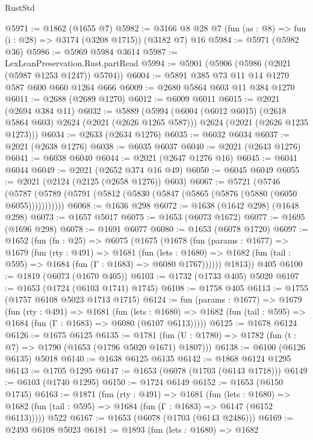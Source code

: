 \begin{lexlean}{RustStd}
\begin{coremodule}
@5971 := @1862 (@1655 @7)
@5982 := @3166 @8 @28 @7 (fun (as : @8) => fun (i : @28) => @3174 (@3208 @1715)) (@3182 @7) @16
@5984 := @5971 (@5982 @36)
@5986 := @5969 @5984 @3614
@5987 := LexLeanPreservation.Rust.partRead
@5994 := @5901 (@5906 (@5986 (@2021 (@5987 @1253 @1247)) @5704))
@6004 := @5891 @385 @73 @11 @14 @1270 @587 @600 @660 @1264 @666
@6009 := @2680 @5864 @603 @11 @384 @1270
@6011 := @2688 (@2689 @1270)
@6012 := @6009 @6011
@6015 := @2021 (@2694 @384 @11)
@6032 := @5889
    (@5994
      (@6004 (@6012 @6015) (@2618 @5864 @603) @2624 (@2021 (@2626 @1265 @587)))
      @2624
      (@2021 (@2626 @1235 @1273)))
@6034 := @2633 (@2634 @1276)
@6035 := @6032 @6034
@6037 := @2021 (@2638 @1276)
@6038 := @6035 @6037
@6040 := @2021 (@2643 @1276)
@6041 := @6038 @6040
@6044 := @2021 (@2647 @1276 @16)
@6045 := @6041 @6044
@6049 := @2021 (@2652 @374 @16 @49)
@6050 := @6045 @6049
@6055 := @2021 (@2124 (@2125 (@2658 @1276)) @603)
@6067 := @5721
    (@5746 (@5787 (@5789 (@5791 (@5812 (@5830 (@5847 (@5865 (@5876 (@5880 (@6050 @6055)))))))))))
@6068 := @1636 @298
@6072 := @1638 (@1642 @298) (@1648 @298)
@6073 := @1657 @5017
@6075 := @1653 (@6073 @1672)
@6077 := @1695 (@1696 @298)
@6078 := @1691 @6077
@6080 := @1653 (@6078 @1720)
@6097 := @1652
    (fun (fn : @25) =>
    @6075
      (@1675
        (@1678
          (fun (params : @1677) =>
          @1679
            (fun (rty : @491) =>
            @1681
              (fun (lets : @1680) =>
              @1682 (fun (tail : @595) => @1684 (fun (Γ : @1683) => @6080 @1767))))))
        @1813))
    @405
@6100 := @1819 (@6073 (@1670 @405))
@6103 := @1732 (@1733 @405) @5020
@6107 := @1653 (@1724 (@6103 @1741) @1745)
@6108 := @1758 @405
@6113 := @1755 (@1757 @6108 @5023 @1713 @1715)
@6124 := fun (params : @1677) =>
  @1679
    (fun (rty : @491) =>
    @1681
      (fun (lets : @1680) =>
      @1682 (fun (tail : @595) => @1684 (fun (Γ : @1683) => @6080 (@6107 @6113)))))
@6125 := @1678 @6124
@6126 := @1675 @6125
@6135 := @1781 (fun (U : @1780) => @1782 (fun (t : @7) => @1790 (@1653 (@1796 @5020 @1671) @1807)))
@6138 := @6100 (@6126 @6135) @5018
@6140 := @1638 @6125 @6135
@6142 := @1868 @6124 @1295
@6143 := @1705 @1295
@6147 := @1653 (@6078 (@1703 (@6143 @1718)))
@6149 := @6103 (@1740 @1295)
@6150 := @1724 @6149
@6152 := @1653 (@6150 @1745)
@6163 := @1871
    (fun (rty : @491) =>
    @1681
      (fun (lets : @1680) =>
      @1682 (fun (tail : @595) => @1684 (fun (Γ : @1683) => @6147 (@6152 @6113)))))
    @522
@6167 := @1653 (@6078 (@1703 (@6143 @2486)))
@6169 := @2493 @6108 @5023
@6181 := @1893
    (fun (lets : @1680) =>
    @1682

\end{coremodule}
\end{lexlean}
